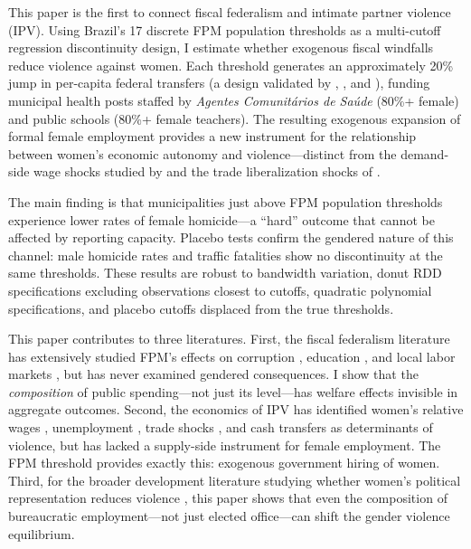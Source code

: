 \documentclass[12pt]{article}
\begin{document}
This paper is the first to connect fiscal federalism and intimate partner violence (IPV). Using Brazil's 17 discrete FPM population thresholds as a multi-cutoff regression discontinuity design, I estimate whether exogenous fiscal windfalls reduce violence against women. Each threshold generates an approximately 20\% jump in per-capita federal transfers (a design validated by \citet{brollo2013federal}, \citet{litschig2013impact}, and \citet{corbi2019fiscal}), funding municipal health posts staffed by \textit{Agentes Comunit\'{a}rios de Sa\'{u}de} (80\%+ female) and public schools (80\%+ female teachers). The resulting exogenous expansion of formal female employment provides a new instrument for the relationship between women's economic autonomy and violence---distinct from the demand-side wage shocks studied by \citet{aizer2010wages} and the trade liberalization shocks of \citet{erten2018female}.

The main finding is that municipalities just above FPM population thresholds experience lower rates of female homicide---a ``hard'' outcome that cannot be affected by reporting capacity. Placebo tests confirm the gendered nature of this channel: male homicide rates and traffic fatalities show no discontinuity at the same thresholds. These results are robust to bandwidth variation, donut RDD specifications excluding observations closest to cutoffs, quadratic polynomial specifications, and placebo cutoffs displaced from the true thresholds.

This paper contributes to three literatures. First, the fiscal federalism literature has extensively studied FPM's effects on corruption \citep{brollo2013federal}, education \citep{litschig2013impact}, and local labor markets \citep{corbi2019fiscal}, but has never examined gendered consequences. I show that the \textit{composition} of public spending---not just its level---has welfare effects invisible in aggregate outcomes. Second, the economics of IPV has identified women's relative wages \citep{aizer2010wages}, unemployment \citep{anderberg2016unemployment}, trade shocks \citep{erten2018female}, and cash transfers \citep{bobonis2013does, hidrobo2016effect} as determinants of violence, but has lacked a supply-side instrument for female employment. The FPM threshold provides exactly this: exogenous government hiring of women. Third, for the broader development literature studying whether women's political representation reduces violence \citep{bobonis2015does}, this paper shows that even the composition of bureaucratic employment---not just elected office---can shift the gender violence equilibrium.
\end{document}
